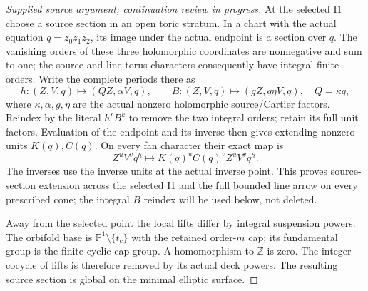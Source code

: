 \begin{proof}[Supplied source argument; continuation review in progress]
At the selected I1 choose a source section in an open toric stratum.
In a chart with the actual equation \(q=z_0z_1z_2\), its image under
the actual endpoint is a section over \(q\). The vanishing orders of
these three holomorphic coordinates are nonnegative and sum to one;
the source and line torus characters consequently have integral finite
orders. Write the complete periods there as
\[
 h:(Z,V,q)\mapsto(QZ,\alpha V,q),\qquad
 B:(Z,V,q)\mapsto(gZ,q\eta V,q),\quad Q=\kappa q,
 \tag{EF.24}
\]
where \(\kappa,\alpha,g,\eta\) are the actual nonzero holomorphic
source/Cartier factors. Reindex by the literal \(h^rB^k\) to remove
the two integral orders; retain its full unit factors. Evaluation of
the endpoint and its inverse then gives extending nonzero units
\(K(q),C(q)\). On every fan character their exact map is
\[
 Z^uV^vq^h\longmapsto K(q)^uC(q)^vZ^uV^vq^h.
 \tag{EF.25}
\]
The inverses use the inverse units at the actual inverse point. This
proves source-section extension across the selected I1 and the full
bounded line arrow on every prescribed cone; the integral \(B\)
reindex will be used below, not deleted.

Away from the selected point the local lifts differ by integral
suspension powers. The orbifold base is \(\mathbb P^1\setminus
\{t_c\}\) with the retained order-\(m\) cap; its fundamental group
is the finite cyclic cap group. A homomorphism to \(\mathbb Z\) is
zero. The integer cocycle of lifts is therefore removed by its actual
deck powers. The resulting source section is global on the minimal
elliptic surface.


\end{proof}
